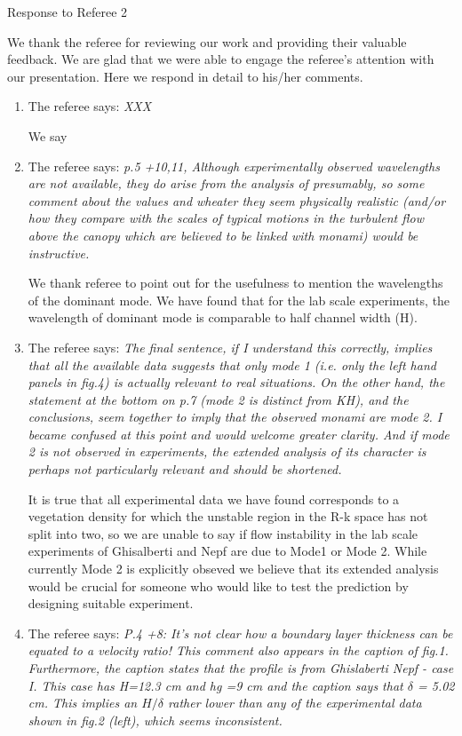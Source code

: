\documentclass[letterpaper,10pt]{article}
\begin{document}
\newpage
\centerline{Response to Referee 2}
We thank the referee for reviewing our work and providing their valuable feedback. 
We are glad that we were able to engage the referee's attention with our presentation.
Here we respond in detail to his/her comments.
\begin{enumerate}
\item The referee says:
\textit{
XXX
}

We say

\item The referee says:
\textit{p.5 +10,11, Although experimentally observed wavelengths are not available, they do arise from the analysis of presumably, so some comment about the values and wheater they seem physically realistic (and/or how they compare with the scales of typical motions in the turbulent flow above the canopy which are believed to be linked with monami) would be instructive.
}

We thank referee to point out for the usefulness to mention the wavelengths of the dominant mode. We have found that for the lab scale experiments, the wavelength of dominant mode is comparable to half channel width (H). 

\item The referee says:
\textit{
The final sentence, if I understand this correctly, implies that all the
available data suggests that only mode 1 (i.e. only the left hand panels in
fig.4) is actually relevant to real situations. On the other hand, the
statement at the bottom on p.7 (mode 2 is distinct from KH), and the
conclusions, seem together to imply that the observed monami are mode 2.
I became confused at this point and would welcome greater clarity.
And if mode 2 is not observed in experiments, the extended analysis of its
character is perhaps not particularly relevant and should be shortened.
}

It is true that all experimental data we have found corresponds to a vegetation density for which the unstable region in the R-k space has not split into two, so we are unable to say if flow instability in the lab scale experiments of Ghisalberti and Nepf are due to Mode1 or Mode 2. While currently Mode 2 is explicitly obseved we believe that its extended analysis would be crucial for someone who would like to test the prediction by designing suitable experiment.

\item The referee says:
\textit{
P.4 +8:  
It's not clear how a boundary layer thickness can be equated to a velocity
ratio! This comment also appears in the caption of fig.1.
Furthermore, the caption states that the profile is from Ghislaberti Nepf
- case I. This case has H=12.3 cm and hg =9 cm and the caption says that $\delta$
= 5.02 cm. This implies an $H/\delta$ rather lower than any of the experimental
data shown in fig.2 (left), which seems inconsistent.
}


\end{enumerate}
\end{document}
